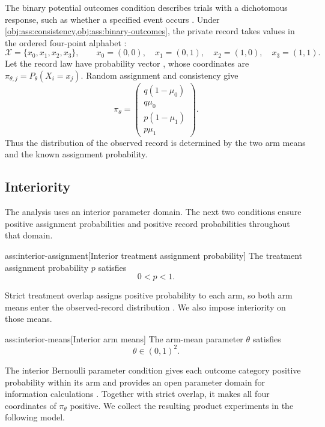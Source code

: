 \documentclass[11pt]{article}
\begin{document}
The binary potential outcomes condition describes trials with a dichotomous response, such as whether a specified event occurs \citep{OhnishiAwan2025}. Under \cref{obj:ass:consistency,obj:ass:binary-outcomes}, the private record takes values in the ordered four-point alphabet :
\[
\mathcal X=\{x_0,x_1,x_2,x_3\},
\qquad
x_0=(0,0),\quad x_1=(0,1),\quad
x_2=(1,0),\quad x_3=(1,1).
\]
Let the record law  have probability vector , whose coordinates are \(\pi_{\theta,j}=P_\theta(X_i=x_j)\). Random assignment and consistency give
\[
\pi_\theta=
\begin{pmatrix}
q(1-\mu_0)\\
q\mu_0\\
p(1-\mu_1)\\
p\mu_1
\end{pmatrix}.
\]
Thus the distribution of the observed record is determined by the two arm means and the known assignment probability.

\subsection{Interiority}

The analysis uses an interior parameter domain. The next two conditions ensure positive assignment probabilities and positive record probabilities throughout that domain.

\begin{assumptionv}{ass:interior-assignment}[Interior treatment assignment probability]
The treatment assignment probability \(p\) satisfies
\[
0<p<1.
\]
\end{assumptionv}

Strict treatment overlap assigns positive probability to each arm, so both arm means enter the observed-record distribution \citep{OhnishiAwan2025}. We also impose interiority on those means.

\begin{assumptionv}{ass:interior-means}[Interior arm means]
The arm-mean parameter \(\theta\) satisfies
\[
\theta\in(0,1)^2.
\]
\end{assumptionv}

The interior Bernoulli parameter condition gives each outcome category positive probability within its arm and provides an open parameter domain for information calculations \citep{Steinberger2024}. Together with strict overlap, it makes all four coordinates of \(\pi_\theta\) positive. We collect the resulting product experiments in the following model.
\end{document}
